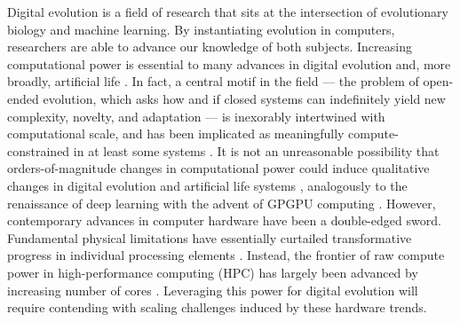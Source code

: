 
Digital evolution is a field of research that sits at the intersection of evolutionary biology and machine learning.
By instantiating evolution in computers, researchers are able to advance our knowledge of both subjects.
Increasing computational power is essential to many advances in digital evolution and, more broadly, artificial life \citep{ackley2014indefinitely}.
In fact, a central motif in the field --- the problem of open-ended evolution, which asks how and if closed systems can indefinitely yield new complexity, novelty, and adaptation --- is inexorably intertwined with computational scale, and has been implicated as meaningfully compute-constrained in at least some systems \citep{taylor2016open,channon2019maximum}.
It is not an unreasonable possibility that orders-of-magnitude changes in computational power could induce qualitative changes in digital evolution and artificial life systems \citep{moreno2022engineering}, analogously to the renaissance of deep learning with the advent of GPGPU computing \citep{krizhevsky2012imagenet}.
However, contemporary advances in computer hardware have been a double-edged sword.
Fundamental physical limitations have essentially curtailed transformative progress in individual processing elements \citep{sutter2005free}.
Instead, the frontier of raw compute power in high-performance computing (HPC) has largely been advanced by increasing number of cores \citep{morgenstern2021unparalleled}.
Leveraging this power for digital evolution will require contending with scaling challenges induced by these hardware trends.

